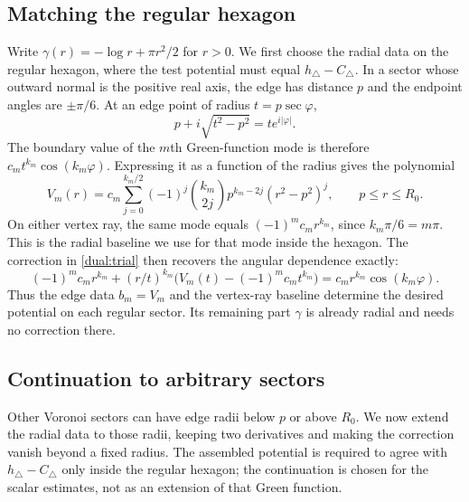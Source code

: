 \subsection{Matching the regular hexagon}
Write $\gamma(r)=-\log r+\pi r^2/2$ for $r>0$.
We first choose the radial data on the regular hexagon, where the test
potential must equal $h_\triangle-C_\triangle$.  In a sector whose
outward normal is the positive real axis, the edge has distance $p$
and the endpoint angles are $\pm\pi/6$.  At an edge point of radius
$t=p\sec\varphi$,
\[
 p+i\sqrt{t^2-p^2}=te^{i|\varphi|}.
\]
The boundary value of the $m$th Green-function mode is therefore
$c_mt^{k_m}\cos(k_m\varphi)$.  Expressing it as a function of the
radius gives the polynomial
\begin{equation}\label{cal:edge-polynomial}
 V_m(r)=c_m\sum_{j=0}^{k_m/2}(-1)^j\binom{k_m}{2j}
                          p^{k_m-2j}(r^2-p^2)^j,
 \qquad p\le r\le R_0.
\end{equation}
On either vertex ray, the same mode equals
$(-1)^mc_mr^{k_m}$, since $k_m\pi/6=m\pi$.  This is the radial
baseline we use for that mode inside the hexagon.  The correction in
\eqref{dual:trial} then recovers the angular dependence exactly:
\[
 (-1)^mc_mr^{k_m}
   +(r/t)^{k_m}\bigl(V_m(t)-(-1)^mc_mt^{k_m}\bigr)
       =c_mr^{k_m}\cos(k_m\varphi).
\]
Thus the edge data $b_m=V_m$ and the vertex-ray baseline determine the
desired potential on each regular sector.  Its remaining part $\gamma$
is already radial and needs no correction there.

\subsection{Continuation to arbitrary sectors}
Other Voronoi sectors can have edge radii below $p$ or above $R_0$.
We now extend the radial data to those radii, keeping two derivatives
and making the correction vanish beyond a fixed radius.  The assembled
potential is required to agree with $h_\triangle-C_\triangle$ only
inside the regular hexagon; the continuation is chosen for the scalar
estimates, not as an extension of that Green function.

